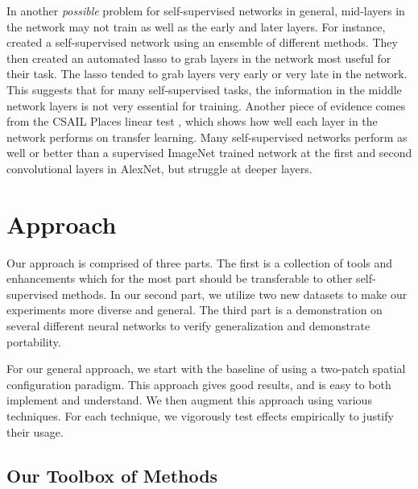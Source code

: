 \documentclass[10pt,twocolumn,letterpaper]{article}
\begin{document}
In another \emph{possible} problem for self-supervised networks in general, mid-layers in the network may not train as well as the early and later layers.  For instance, \cite{Doersch17} created a self-supervised network using an ensemble of different methods. They then created an automated lasso to grab layers in the network most useful for their task. The lasso tended to grab layers very early or very late in the network. This suggests that for many self-supervised tasks, the information in the middle network layers is not very essential for training. Another piece of evidence comes from the CSAIL Places linear test \cite{Zhang17,Zhang16}, which shows how well each layer in the network performs on transfer learning. Many self-supervised networks perform as well or better than a supervised ImageNet trained network at the first and second convolutional layers in AlexNet, but struggle at deeper layers. 


\section{Approach}

Our approach is comprised of three parts. The first is a collection of tools and enhancements which for the most part should be transferable to other self-supervised methods. In our second part, we utilize two new datasets to make our experiments more diverse and general. The third part is a demonstration on several different neural networks to verify generalization and demonstrate portability.

For our general approach, we start with the baseline of \cite{Doersch15} using a two-patch spatial configuration paradigm. This approach gives good results, and is easy to both implement and understand. We then augment this approach using various techniques. For each technique, we vigorously test effects empirically to justify their usage.

\subsection{Our Toolbox of Methods}
\end{document}
